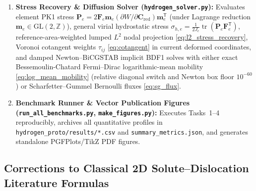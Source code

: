 \documentclass[11pt,a4paper]{article}
\newcommand{\Z}{\mathbb{Z}}
\newcommand{\T}{^{\mathsf T}}
\newcommand{\tr}{\operatorname{tr}}
\newcommand{\code}[1]{\texttt{#1}}
\begin{document}
\begin{enumerate}[nosep]
  \item \textbf{Stress Recovery \& Diffusion Solver (\code{hydrogen\_solver.py}):} Evaluates element PK1 stress $\mathbf{P}_e = 2\mathbf{F}_e\mathbf{m}_e(\partial W/\partial\mathbf{C}_{\text{red}})\mathbf{m}_e\T$ (under Lagrange reduction $\mathbf{m}_e \in \mathrm{GL}(2,\Z)$), general virial hydrostatic stress $\sigma_{h,e} = \frac{1}{2J_e}\tr(\mathbf{P}_e\mathbf{F}_e\T)$, reference-area-weighted lumped $L^2$ nodal projection \eqref{eq:l2_stress_recovery}, Voronoi cotangent weights $\tau_{ij}$ \eqref{eq:cotangent} in current deformed coordinates, and damped Newton--BiCGSTAB implicit BDF1 solves with either exact Bessemoulin-Chatard Fermi--Dirac logarithmic-mean mobility \eqref{eq:log_mean_mobility} (relative diagonal switch and Newton box floor $10^{-60}$) or Scharfetter--Gummel Bernoulli fluxes \eqref{eq:sg_flux}.
  \item \textbf{Benchmark Runner \& Vector Publication Figures (\code{run\_all\_benchmarks.py}, \code{make\_figures.py}):} Executes Tasks~1--4 reproducibly, archives all quantitative profiles in \code{hydrogen\_proto/results/*.csv} and \code{summary\_metrics.json}, and generates standalone PGFPlots/TikZ PDF figures.
\end{enumerate}

\subsection{Corrections to Classical 2D Solute--Dislocation Literature Formulas}
\label{subsec:lit_corrections}
\end{document}
